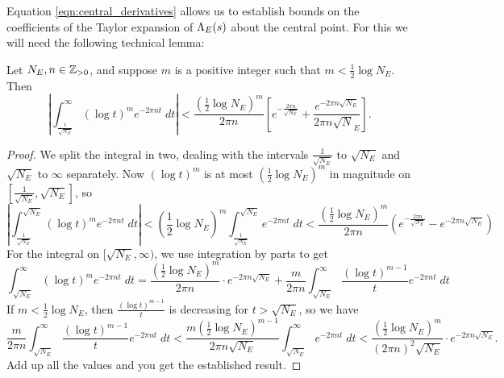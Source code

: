 Equation \ref{eqn:central_derivatives} allows us to establish bounds on the coefficients of the Taylor expansion of $\Lambda_E(s)$ about the central point. For this we will need the following technical lemma:
\begin{lemma}\label{lem:central_deriv_int_bounds}
Let $N_E,n \in \mathbb{Z}_{>0}$, and suppose $m$ is a positive integer such that $m < \frac{1}{2}\log N_E$. Then
\begin{equation}
\left| \int_{\frac{1}{\sqrt{N_E}}}^{\infty} (\log t)^{m} e^{-2\pi n t} \; dt \right| < \frac{\left(\frac{1}{2} \log N_E\right)^{m}}{2\pi n}\left[ e^{-\frac{2\pi n}{\sqrt{N_E}}} + \frac{e^{-2\pi n\sqrt{N_E}}}{2\pi n \sqrt N_E} \right].
\end{equation}
\end{lemma}
\begin{proof}
We split the integral in two, dealing with the intervals $\frac{1}{\sqrt{N_E}}$ to $\sqrt{N_E}$ and $\sqrt{N_E}$ to $\infty$ separately. Now $(\log t)^{m}$ is at most $(\frac{1}{2}\log N_E)^m$ in magnitude on $[\frac{1}{\sqrt{N_E}},\sqrt{N_E}]$, so
\begin{equation*}
\left| \int_{\frac{1}{\sqrt{N_E}}}^{\sqrt{N_E}} (\log t)^{m} e^{-2\pi n t} \; dt \right| < \left(\frac{1}{2} \log N_E\right)^m \int_{\frac{1}{\sqrt{N_E}}}^{\sqrt{N_E}} e^{-2\pi n t} \; dt < \frac{\left(\frac{1}{2} \log N_E\right)^{m}}{2\pi n}\left(e^{-\frac{2\pi n}{\sqrt{N_E}}} - e^{-2\pi n\sqrt{N_E}}\right)
\end{equation*}
For the integral on $[\sqrt{N_E},\infty)$, we use integration by parts to get
\begin{equation*}
\int_{\sqrt{N_E}}^{\infty} \left(\log t \right)^{m} e^{-2\pi n t} \; dt = \frac{\left(\frac{1}{2} \log N_E\right)^{m}}{2\pi n}\cdot e^{-2\pi n\sqrt{N_E}} + \frac{m}{2\pi n} \int_{\sqrt{N_E}}^{\infty} \frac{\left(\log t \right)^{m-1}}{t} e^{-2\pi n t} \; dt 
\end{equation*}
If $m < \frac{1}{2}\log N_E$, then $\frac{\left(\log t \right)^{m-1}}{t}$ is decreasing for $t > \sqrt{N_E}$, so we have
\begin{equation*}
\frac{m}{2\pi n} \int_{\sqrt{N_E}}^{\infty} \frac{\left(\log t \right)^{m-1}}{t} e^{-2\pi n t} \; dt < \frac{m\left(\frac{1}{2} \log N_E\right)^{m-1}}{2\pi n\sqrt{N_E}} \int_{\sqrt{N_E}}^{\infty} e^{-2\pi n t} \; dt < \frac{\left(\frac{1}{2} \log N_E\right)^{m}}{(2\pi n)^2 \sqrt{N_E}} \cdot e^{-2\pi n \sqrt{N_E}}.
\end{equation*}
Add up all the values and you get the established result.
\end{proof}

